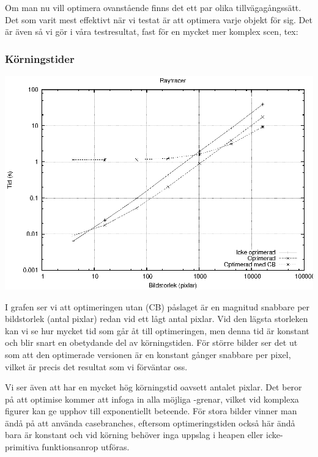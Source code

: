 \documentclass[Rapport]{subfiles}
\begin{document}
Om man nu vill optimera ovanstående finns det ett par olika tillvägagångssätt. Det som varit mest effektivt när vi testat är att optimera varje objekt för sig. Det är även så vi gör i våra testresultat, fast för en mycket mer komplex scen, tex: 

\subsubsection{Körningstider}
\includegraphics{shapes.eps}

I grafen ser vi att optimeringen utan  (CB) påslaget är en
magnitud snabbare per bildstorlek (antal pixlar) redan vid ett lågt antal pixlar.
Vid den lägsta storleken kan vi se hur mycket tid som går åt till optimeringen,
men denna tid är konstant och blir snart en obetydande del av körningstiden. För
större bilder ser det ut som att den optimerade versionen är en konstant gånger
snabbare per pixel, vilket är precis det resultat som vi förväntar oss.

Vi ser även att  har en mycket hög körningstid oavsett antalet pixlar. 
Det beror på att optimise kommer att infoga in alla möjliga -grenar, 
vilket vid komplexa figurer kan ge upphov till exponentiellt beteende.
För stora bilder vinner man ändå på att använda casebranches, eftersom optimeringstiden
också här ändå bara är konstant och vid körning behöver inga uppslag i heapen eller icke-primitiva funktionsanrop utföras. 
\end{document}
